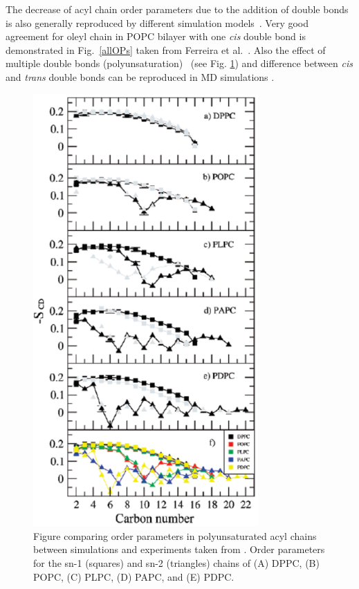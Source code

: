 \documentclass[aps,prl,superscriptaddress,twocolumn]{revtex4}
\begin{document}
The decrease of acyl chain order parameters due to the addition of double bonds is also 
generally reproduced by different simulation 
models~\cite{hyvonen97,hyvonen97b,hyvonen05,ollila07a,dickson12,klauda10,ferreira13,jambeck13,lee14,dickson14}. 
Very good agreement for oleyl chain in POPC bilayer with one {\it cis} double bond is demonstrated in Fig.~\ref{allOPs} 
taken from Ferreira et al.~\cite{ferreira13}.
Also the effect of multiple double bonds (polyunsaturation)~\cite{hyvonen97,hyvonen97b,hyvonen05,ollila07a,??} (see Fig. \ref{polyunsat})
and difference between {\it cis} and {\it trans} double bonds can be reproduced in MD simulations \cite{kulig15b}.
\begin{figure}[]
  \includegraphics[width=8.6cm]{../Fig/polyunsat.eps}
\newline
  \caption{\label{polyunsat}
   Figure comparing order parameters in polyunsaturated acyl chains between simulations and 
   experiments taken from \cite{ollila07a}.
   Order parameters for the sn-1 (squares) and sn-2 (triangles)
   chains of (A) DPPC, (B) POPC, (C) PLPC, (D) PAPC, and (E) PDPC.
}
\end{figure}
\end{document}
